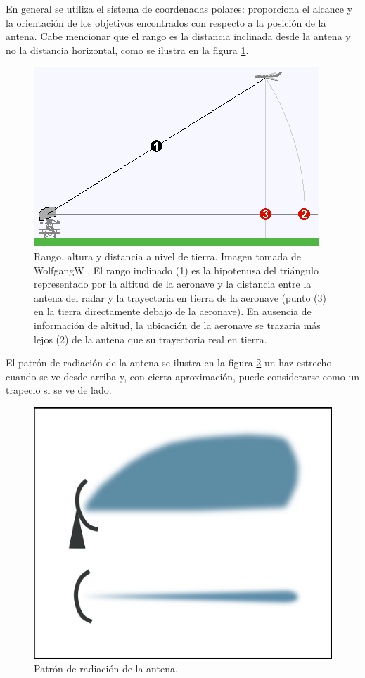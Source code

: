 En general se utiliza el sistema de coordenadas polares: proporciona el alcance y la orientación de los objetivos encontrados con respecto a la posición de la antena. Cabe mencionar que el rango es la distancia inclinada \citep{radar_tutorial_slant_range} desde la antena y no la distancia horizontal, como se ilustra en la figura \ref{Rango_figura}.
 
\begin{figure}
\centering
\includegraphics[scale=0.65]{./Figures/Slant_range.png}
\caption{Rango, altura y distancia a nivel de tierra. Imagen tomada de WolfgangW \citep{WolfgangW}. El rango inclinado (1) es la hipotenusa del triángulo representado por la altitud de la aeronave y la distancia entre la antena del radar y la trayectoria en tierra de la aeronave (punto (3) en la tierra directamente debajo de la aeronave). En ausencia de información de altitud, la ubicación de la aeronave se trazaría más lejos (2) de la antena que su trayectoria real en tierra.} 
\label{Rango_figura}
\end{figure}


El patrón de radiación de la antena se ilustra en la figura \ref{patrón_de_radiación} un haz estrecho cuando se ve desde arriba y, con cierta aproximación, puede considerarse como un trapecio si se ve de lado.


\begin{figure}
\centering
\includegraphics[scale=0.2]{./Figures/PSR_vistas.png}
\caption{Patrón de radiación de la antena.}
\label{patrón_de_radiación}
\end{figure}


